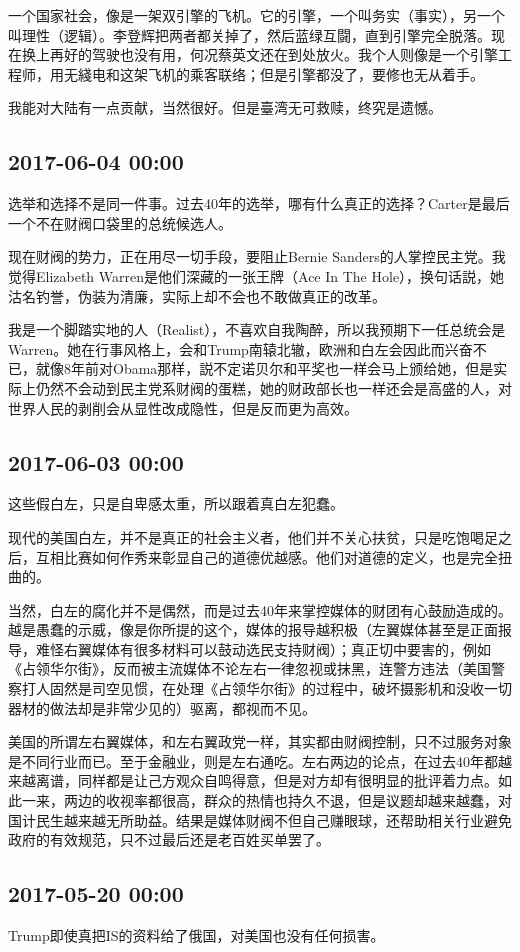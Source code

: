 \documentclass[twocolumn]{ctexart}
\begin{document}
一个国家社会，像是一架双引擎的飞机。它的引擎，一个叫务实（事实），另一个叫理性（逻辑）。李登辉把两者都关掉了，然后蓝绿互闘，直到引擎完全脱落。现在换上再好的驾驶也没有用，何况蔡英文还在到处放火。我个人则像是一个引擎工程师，用无綫电和这架飞机的乘客联络；但是引擎都没了，要修也无从着手。

我能对大陆有一点贡献，当然很好。但是臺湾无可救赎，终究是遗憾。\subsection*{2017-06-04 00:00}
选举和选择不是同一件事。过去40年的选举，哪有什么真正的选择？Carter是最后一个不在财阀口袋里的总统候选人。

现在财阀的势力，正在用尽一切手段，要阻止Bernie Sanders的人掌控民主党。我觉得Elizabeth Warren是他们深藏的一张王牌（Ace In The Hole），换句话説，她沽名钓誉，伪装为清廉，实际上却不会也不敢做真正的改革。

我是一个脚踏实地的人（Realist），不喜欢自我陶醉，所以我预期下一任总统会是Warren。她在行事风格上，会和Trump南辕北辙，欧洲和白左会因此而兴奋不已，就像8年前对Obama那样，説不定诺贝尔和平奖也一样会马上颁给她，但是实际上仍然不会动到民主党系财阀的蛋糕，她的财政部长也一样还会是高盛的人，对世界人民的剥削会从显性改成隐性，但是反而更为高效。\subsection*{2017-06-03 00:00}
这些假白左，只是自卑感太重，所以跟着真白左犯蠢。

现代的美国白左，并不是真正的社会主义者，他们并不关心扶贫，只是吃饱喝足之后，互相比赛如何作秀来彰显自己的道德优越感。他们对道德的定义，也是完全扭曲的。

当然，白左的腐化并不是偶然，而是过去40年来掌控媒体的财团有心鼓励造成的。越是愚蠢的示威，像是你所提的这个，媒体的报导越积极（左翼媒体甚至是正面报导，难怪右翼媒体有很多材料可以鼓动选民支持财阀）；真正切中要害的，例如《占领华尔街》，反而被主流媒体不论左右一律忽视或抹黑，连警方违法（美国警察打人固然是司空见惯，在处理《占领华尔街》的过程中，破坏摄影机和没收一切器材的做法却是非常少见的）驱离，都视而不见。

美国的所谓左右翼媒体，和左右翼政党一样，其实都由财阀控制，只不过服务对象是不同行业而已。至于金融业，则是左右通吃。左右两边的论点，在过去40年都越来越离谱，同样都是让己方观众自鸣得意，但是对方却有很明显的批评着力点。如此一来，两边的收视率都很高，群众的热情也持久不退，但是议题却越来越蠢，对国计民生越来越无所助益。结果是媒体财阀不但自己赚眼球，还帮助相关行业避免政府的有效规范，只不过最后还是老百姓买单罢了。\subsection*{2017-05-20 00:00}
Trump即使真把IS的资料给了俄国，对美国也没有任何损害。
\end{document}
